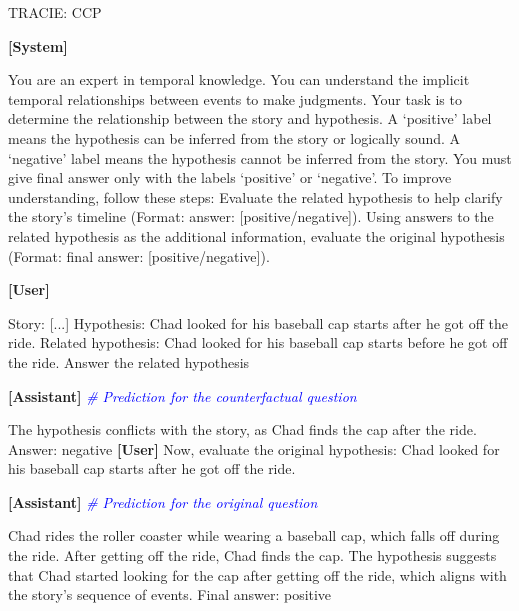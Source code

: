 \begin{myColorbox}[]{TRACIE: CCP}

\textbf{[System]}

You are an expert in temporal knowledge. You can understand the implicit temporal relationships between events to make judgments. Your task is to determine the relationship between the story and hypothesis. A `positive' label means the hypothesis can be inferred from the story or logically sound. A `negative' label means the hypothesis cannot be inferred from the story. You must give final answer only with the labels `positive' or `negative'. 
To improve understanding, follow these steps: Evaluate the related hypothesis to help clarify the story's timeline (Format: answer: [positive/negative]). Using answers to the related hypothesis as the additional information, evaluate the original hypothesis (Format: final answer: [positive/negative]).

\textbf{[User]}

Story: [...] \newline
Hypothesis: Chad looked for his baseball cap starts after he got off the ride. \newline
Related hypothesis: Chad looked for his baseball cap starts before he got off the ride. \newline
Answer the related hypothesis

\textbf{[Assistant]}  \textit{\textcolor{blue}{\# Prediction for the counterfactual question}}

The hypothesis conflicts with the story, as Chad finds the cap after the ride.
\newline
Answer: negative
\newline 
\textbf{[User]}
\newline
Now, evaluate the original hypothesis: Chad looked for his baseball cap starts after he got off the ride.

\textbf{[Assistant]}  \textit{\textcolor{blue}{\# Prediction for the original question}}

Chad rides the roller coaster while wearing a baseball cap, which falls off during the ride. After getting off the ride, Chad finds the cap. The hypothesis suggests that Chad started looking for the cap after getting off the ride, which aligns with the story's sequence of events.
\newline
Final answer: positive

\end{myColorbox}